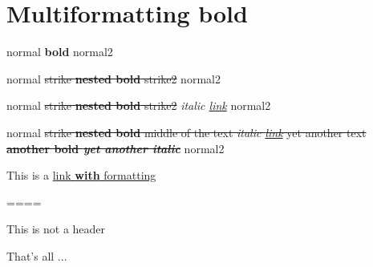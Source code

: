\section{Multiformatting \textbf{bold}}



normal \textbf{bold} normal2

normal \sout{strike \textbf{nested bold} strike2} normal2

normal \sout{strike \textbf{nested bold} strike2} \emph{italic \href{https://example.org}{link}} normal2

normal \sout{strike  \textbf{nested bold} middle of the text \emph{italic \href{https://example.org}{link}} yet another text \textbf{another bold \emph{yet another italic}} } normal2



This is a \href{https://example.org}{link \textbf{with} formatting}



====

This is not a header



That's all ...

